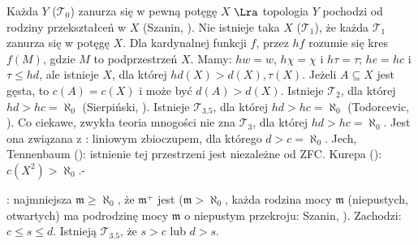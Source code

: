 Każda $Y$ ($\mathcal T_0$) zanurza się w pewną potęgę $X$ $\Lra$ topologia $Y$ pochodzi od rodziny przekształceń w $X$ (Szanin, ).
Nie istnieje taka $X$ ($\mathcal T_1$), że każda $\mathcal T_1$ zanurza się w potęgę $X$.
Dla kardynalnej funkcji $f$, przez $hf$ rozumie się kres $f(M)$, gdzie $M$ to podprzestrzeń $X$.
Mamy: $hw = w$, $h\chi = \chi$ i $h \tau = \tau$; $he = hc$ i $\tau \le hd$, ale istnieje $X$, dla której $hd(X) > d(X), \tau(X)$.
Jeżeli $A \subseteq X$ jest gęsta, to $c(A) = c(X)$ i może być $d(A) > d(X)$.
Istnieje $\mathcal T_2$, dla której $hd > hc = \aleph_0$ (Sierpiński, ).
Istnieje $\mathcal T_{3.5}$, dla której $hd > hc = \aleph_0$ (Todorcevic, ). 
Co ciekawe, zwykła teoria mnogości nie zna $\mathcal T_3$, dla której $hd > hc = \aleph_0$.
Jest ona związana z : liniowym zbioczupem, dla którego $d > c = \aleph_0$.
Jech, Tennenbaum (): istnienie tej przestrzeni jest niezależne od ZFC.
Kurepa (): $c(X^2) > \aleph_0$.-

: najmniejsza $\mathfrak m \ge \aleph_0$, że $\mathfrak m^+$ jest  ($\mathfrak m > \aleph_0$,  każda rodzina mocy $\mathfrak m$ (niepustych, otwartych) ma podrodzinę mocy $\mathfrak m$ o niepustym przekroju: Szanin, ).
Zachodzi: $c \le s \le d$.
Istnieją $\mathcal T_{3.5}$, że $s > c$ lub $d > s$.